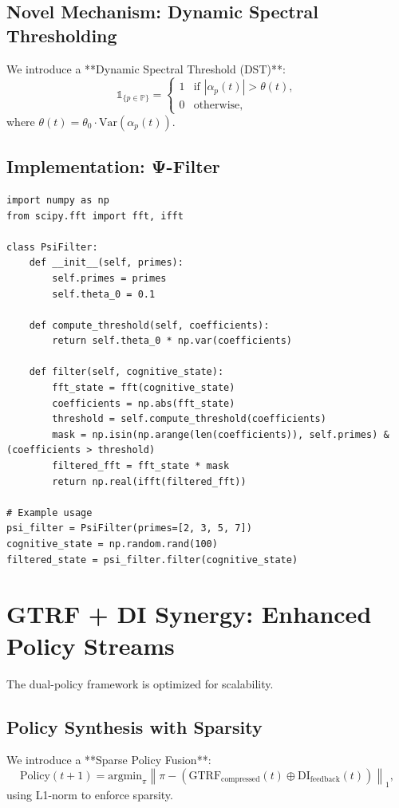 \documentclass[12pt]{article}
\begin{document}
\subsection{Novel Mechanism: Dynamic Spectral Thresholding}
We introduce a **Dynamic Spectral Threshold (DST)**:
\[
\mathbb{1}_{\{p \in \mathbb{P}\}} = \begin{cases} 
1 & \text{if } |\alpha_p(t)| > \theta(t), \\
0 & \text{otherwise},
\end{cases}
\]
where $\theta(t) = \theta_0 \cdot \text{Var}(\alpha_p(t))$.

\subsection{Implementation: Ψ-Filter}
\begin{verbatim}
import numpy as np
from scipy.fft import fft, ifft

class PsiFilter:
    def __init__(self, primes):
        self.primes = primes
        self.theta_0 = 0.1
    
    def compute_threshold(self, coefficients):
        return self.theta_0 * np.var(coefficients)
    
    def filter(self, cognitive_state):
        fft_state = fft(cognitive_state)
        coefficients = np.abs(fft_state)
        threshold = self.compute_threshold(coefficients)
        mask = np.isin(np.arange(len(coefficients)), self.primes) & (coefficients > threshold)
        filtered_fft = fft_state * mask
        return np.real(ifft(filtered_fft))

# Example usage
psi_filter = PsiFilter(primes=[2, 3, 5, 7])
cognitive_state = np.random.rand(100)
filtered_state = psi_filter.filter(cognitive_state)
\end{verbatim}

\section{GTRF + DI Synergy: Enhanced Policy Streams}
The dual-policy framework is optimized for scalability.

\subsection{Policy Synthesis with Sparsity}
We introduce a **Sparse Policy Fusion**:
\[
\text{Policy}(t+1) = \text{argmin}_{\pi} \left\| \pi - (\text{GTRF}_{\text{compressed}}(t) \oplus \text{DI}_{\text{feedback}}(t)) \right\|_1,
\]
using L1-norm to enforce sparsity.
\end{document}

